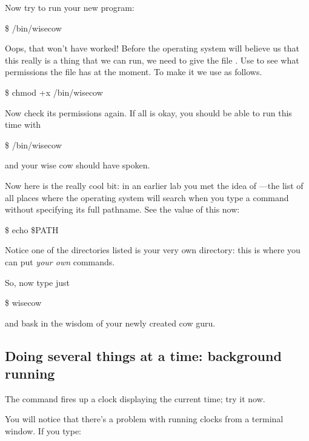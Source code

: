 Now try to run your new program:

\begin{ttoutenv}
\$  \tilde/bin/wisecow
\end{ttoutenv}

Oops, that won't have worked! Before the operating system will believe us
that this really is a thing that we can run, we need to give the file . Use  to see what permissions the file has at the
moment. To make it  we use  as follows.

\begin{ttoutenv}
\$  chmod +x \tilde/bin/wisecow
\end{ttoutenv}

Now check its permissions again. If all is okay, you should be able to run
this time with

\begin{ttoutenv}
\$  \tilde/bin/wisecow
\end{ttoutenv}

and your wise cow should have spoken.

Now here is the really cool bit: in an earlier lab you met the idea of
---the list of all places where the operating system will
search when you type a command without specifying its full pathname. See the
value of this now:

\begin{ttoutenv}
\$  echo \$PATH
\end{ttoutenv}

Notice one of the directories listed is your very own  directory: this
is where you can put \emph{your own} commands.

So, now type just

\begin{ttoutenv}
\$ wisecow
\end{ttoutenv}

and bask in the wisdom of your newly created cow guru.
\subsection{Doing several things at a time: background running}

The command  fires up a clock displaying the current time; try it now.

You will notice that there's a problem with running clocks from a terminal window.
If you type:

